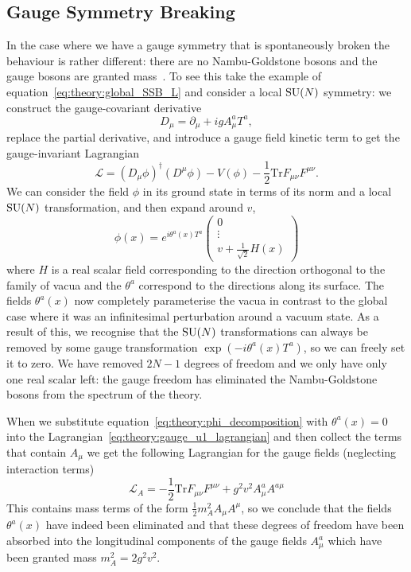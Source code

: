 \subsection{Gauge Symmetry Breaking}
In the case where we have a gauge symmetry that is spontaneously broken the behaviour is rather different: there are no Nambu-Goldstone bosons and the gauge bosons are granted mass~\cite{AndersonSSB,BroutEnglert,HiggsPaper,KibbleEtc}. 
To see this take the example of equation~\ref{eq:theory:global_SSB_L} and consider a local ${\mathrm{SU}(N)}$ symmetry: we construct the gauge-covariant derivative
%
\begin{equation}
    \label{eq:theory:gauge_cov_deriv_u1}
    D_{\mu} = \partial_{\mu} + igA^{a}_{\mu}T^{a},
\end{equation}
%
replace the partial derivative, and introduce a gauge field kinetic term to get the gauge-invariant Lagrangian
\begin{equation}
    \label{eq:theory:gauge_u1_lagrangian}
    \mathcal{L} = (D_{\mu}\phi)^{\dag}(D^{\mu}\phi) - V(\phi) - \frac{1}{2}\mathrm{Tr}F_{\mu\nu}F^{\mu\nu}.
\end{equation}
%
We can consider the field $\phi$ in its ground state in terms of its norm and a local ${\mathrm{SU}(N)}$ transformation, and then expand around $v$,
\begin{equation}
    \label{eq:theory:phi_decomposition}
    \phi(x) = e^{i\theta^{a}(x)T^{a}}\begin{pmatrix}
        0\\
        \vdots\\
        v + \frac{1}{\sqrt{2}}H(x)
    \end{pmatrix}
\end{equation}
where $H$ is a real scalar field corresponding to the direction orthogonal to the family of vacua and  the $\theta^{a}$ correspond to the directions along its surface. The fields $\theta^{a}(x)$ now completely parameterise the vacua in contrast to the global case where it was an infinitesimal perturbation around a vacuum state.
As a result of this, we recognise that the ${\mathrm{SU}(N)}$ transformations can always be removed by some gauge transformation $\exp(-i\theta^{a}(x)T^{a})$, so we can freely set it to zero. 
We have removed $2N-1$ degrees of freedom and we only have only one real scalar left: the gauge freedom has eliminated the Nambu-Goldstone bosons from the spectrum of the theory.


When we substitute equation~\ref{eq:theory:phi_decomposition} with $\theta^{a}(x)=0$ into the Lagrangian~\ref{eq:theory:gauge_u1_lagrangian} and then collect the terms that contain $A_{\mu}$ we get the following Lagrangian for the gauge fields (neglecting interaction terms)
\begin{equation}
    \label{eq:theory:abelian_gaugefield_L}
    \mathcal{L}_{A} = -\frac{1}{2}\mathrm{Tr}F_{\mu\nu}F^{\mu\nu} + g^{2}v^{2}A^{a}_{\mu}A^{a\mu}
\end{equation}
This contains mass terms of the form $\frac{1}{2}m_{A}^{2}A_{\mu}A^{\mu}$, so we conclude that the fields $\theta^{a}(x)$ have indeed been eliminated and that these degrees of freedom have been absorbed into the longitudinal components of the gauge fields $A^{a}_{\mu}$ which have been granted mass $m_{A}^{2}=2g^{2}v^{2}$. 


